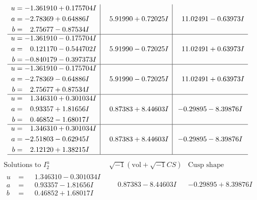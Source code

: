 \documentclass[1p]{elsarticle_modified}
\theoremstyle{definition}
\newcommand{\I}{\sqrt{-1}}
\begin{document}
$$\begin{array}{c|c|c}
\begin{aligned}
u &= -1.361910 + 0.175704 I \\
a &= -2.78369 + 0.64886 I \\
b &= \phantom{-}2.75677 - 0.87534 I\end{aligned}
 & \phantom{-}5.91990 + 0.72025 I & \phantom{-}11.02491 - 0.63973 I \\ \hline\begin{aligned}
u &= -1.361910 - 0.175704 I \\
a &= \phantom{-}0.121170 - 0.544702 I \\
b &= -0.840179 - 0.397373 I\end{aligned}
 & \phantom{-}5.91990 - 0.72025 I & \phantom{-}11.02491 + 0.63973 I \\ \hline\begin{aligned}
u &= -1.361910 - 0.175704 I \\
a &= -2.78369 - 0.64886 I \\
b &= \phantom{-}2.75677 + 0.87534 I\end{aligned}
 & \phantom{-}5.91990 - 0.72025 I & \phantom{-}11.02491 + 0.63973 I \\ \hline\begin{aligned}
u &= \phantom{-}1.346310 + 0.301034 I \\
a &= \phantom{-}0.93357 + 1.81656 I \\
b &= \phantom{-}0.46852 - 1.68017 I\end{aligned}
 & \phantom{-}0.87383 + 8.44603 I & -0.29895 - 8.39876 I \\ \hline\begin{aligned}
u &= \phantom{-}1.346310 + 0.301034 I \\
a &= -2.51803 - 0.62945 I \\
b &= \phantom{-}2.12120 + 1.38215 I\end{aligned}
 & \phantom{-}0.87383 + 8.44603 I & -0.29895 - 8.39876 I\\
 \hline 
 \end{array}$$\newpage$$\begin{array}{c|c|c}  
\text{Solutions to }I^u_{2}& \I (\text{vol} + \sqrt{-1}CS) & \text{Cusp shape}\\
 \hline 
\begin{aligned}
u &= \phantom{-}1.346310 - 0.301034 I \\
a &= \phantom{-}0.93357 - 1.81656 I \\
b &= \phantom{-}0.46852 + 1.68017 I\end{aligned}
 & \phantom{-}0.87383 - 8.44603 I & -0.29895 + 8.39876 I \\ \hline\begin{aligned}

\end{aligned}
\end{array}$$
\end{document}
